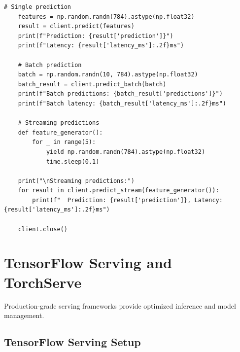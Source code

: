 \begin{lstlisting}[style=python, caption=gRPC client implementation]
    # Single prediction
    features = np.random.randn(784).astype(np.float32)
    result = client.predict(features)
    print(f"Prediction: {result['prediction']}")
    print(f"Latency: {result['latency_ms']:.2f}ms")

    # Batch prediction
    batch = np.random.randn(10, 784).astype(np.float32)
    batch_result = client.predict_batch(batch)
    print(f"Batch predictions: {batch_result['predictions']}")
    print(f"Batch latency: {batch_result['latency_ms']:.2f}ms")

    # Streaming predictions
    def feature_generator():
        for _ in range(5):
            yield np.random.randn(784).astype(np.float32)
            time.sleep(0.1)

    print("\nStreaming predictions:")
    for result in client.predict_stream(feature_generator()):
        print(f"  Prediction: {result['prediction']}, Latency: {result['latency_ms']:.2f}ms")

    client.close()
\end{lstlisting}

\section{TensorFlow Serving and TorchServe}

Production-grade serving frameworks provide optimized inference and model management.

\subsection{TensorFlow Serving Setup}

